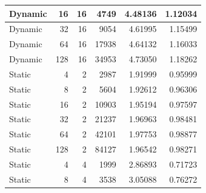 \documentclass[journal,transmag]{IEEEtran}
\begin{document}
\begin{table}[h]
\begin{tabular}{|l|r|r|r|r|r|}
		Dynamic       & 16                           & 16                           & 4749                              & 4.48136                       & 1.12034                         \\ \hline
		Dynamic       & 32                           & 16                           & 9054                              & 4.61995                       & 1.15499                         \\ \hline
		Dynamic       & 64                           & 16                           & 17938                             & 4.64132                       & 1.16033                         \\ \hline
		Dynamic       & 128                          & 16                           & 34953                             & 4.73050                       & 1.18262                         \\ \hline
		Static        & 4                            & 2                            & 2987                              & 1.91999                       & 0.95999                         \\ \hline
		Static        & 8                            & 2                            & 5604                              & 1.92612                       & 0.96306                         \\ \hline
		Static        & 16                           & 2                            & 10903                             & 1.95194                       & 0.97597                         \\ \hline
		Static        & 32                           & 2                            & 21237                             & 1.96963                       & 0.98481                         \\ \hline
		Static        & 64                           & 2                            & 42101                             & 1.97753                       & 0.98877                         \\ \hline
		Static        & 128                          & 2                            & 84127                             & 1.96542                       & 0.98271                         \\ \hline
		Static        & 4                            & 4                            & 1999                              & 2.86893                       & 0.71723                         \\ \hline
		Static        & 8                            & 4                            & 3538                              & 3.05088                       & 0.76272                         \\ \hline

\end{tabular}
\end{table}
\end{document}
